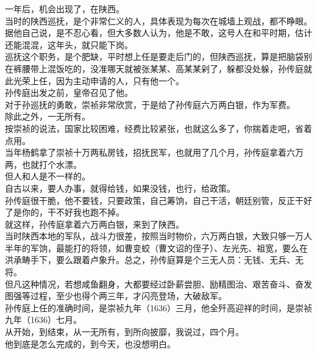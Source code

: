 \begin{multicols}{\theparacolNo}
一年后，机会出现了，在陕西。\\

当时的陕西巡抚，是个非常仁义的人，具体表现为每次在城墙上观战，都不睁眼。据他自己说，是不忍心看，但大多数人认为，他是不敢，这号人在和平时期，估计还能混混，这年头，就只能下岗。\\

巡抚这个职务，是个肥缺，平时想上任是要走后门的，但陕西巡抚，算是把脑袋别在裤腰带上混饭吃的，没准哪天就被张某某、高某某剁了，躲都没处躲，孙传庭就此光荣上任，因为主动申请的人，只有他一个。\\

孙传庭出发之前，皇帝召见了他。\\

对于孙巡抚的勇敢，崇祯非常欣赏，于是给了孙传庭六万两白银，作为军费。\\

除此之外，一无所有。\\

按崇祯的说法，国家比较困难，经费比较紧张，也就这么多了，你揣着走吧，省着点用。\\

当年杨鹤拿了崇祯十万两私房钱，招抚民军，也就用了几个月，孙传庭拿着六万两，也就打个水漂。\\

但人和人是不一样的。\\

自古以来，要人办事，就得给钱，如果没钱，也行，给政策。\\

孙传庭很干脆，他不要钱，只要政策，自己筹饷，自己干活，朝廷别管，反正干好了是你的，干不好我也跑不掉。\\

就这样，孙传庭拿着六万两白银，来到了陕西。\\

当时陕西本地的军队，战斗力很差，按照当时物价，六万两白银，大致只够一万人半年的军饷，最能打的将领，如曹变蛟（曹文诏的侄子）、左光先、祖宽，要么在洪承畴手下，要么跟着卢象升。总之，孙传庭算是个三无人员：无钱、无兵、无将。\\

但凡这种情况，若想咸鱼翻身，大都要经过卧薪尝胆、励精图治、艰苦奋斗、奋发图强等过程，至少也得个两三年，才闪亮登场，大破敌军。\\

孙传庭上任的准确时间，是崇祯九年（1636）三月，他全歼高迎祥的时间，是崇祯九年（1636）七月。\\

从开始，到结束，从一无所有，到所向披靡，我说过，四个月。\\

他到底是怎么完成的，到今天，也没想明白。\\
\ifnum{}
	\end{multicols}
\fi
\newpage
